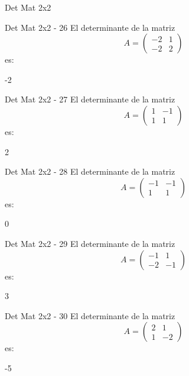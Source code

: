\documentclass[a4,11pt]{aleph-notas}
\begin{document}
\begin{quiz}{Det Mat 2x2}
\begin{numerical}[tolerance=0]%
    {Det Mat 2x2 - 26}
    El determinante de la matriz
    \[
        A = \begin{pmatrix} -2 & 1 \\ -2 & 2 \end{pmatrix}
    \]
    es:
    \item[] -2
\end{numerical}

\begin{numerical}[tolerance=0]%
    {Det Mat 2x2 - 27}
    El determinante de la matriz
    \[
        A = \begin{pmatrix} 1 & -1 \\ 1 & 1 \end{pmatrix}
    \]
    es:
    \item[] 2
\end{numerical}

\begin{numerical}[tolerance=0]%
    {Det Mat 2x2 - 28}
    El determinante de la matriz
    \[
        A = \begin{pmatrix} -1 & -1 \\ 1 & 1 \end{pmatrix}
    \]
    es:
    \item[] 0
\end{numerical}

\begin{numerical}[tolerance=0]%
    {Det Mat 2x2 - 29}
    El determinante de la matriz
    \[
        A = \begin{pmatrix} -1 & 1 \\ -2 & -1 \end{pmatrix}
    \]
    es:
    \item[] 3
\end{numerical}

\begin{numerical}[tolerance=0]%
    {Det Mat 2x2 - 30}
    El determinante de la matriz
    \[
        A = \begin{pmatrix} 2 & 1 \\ 1 & -2 \end{pmatrix}
    \]
    es:
    \item[] -5
\end{numerical}


\end{quiz}
\end{document}
